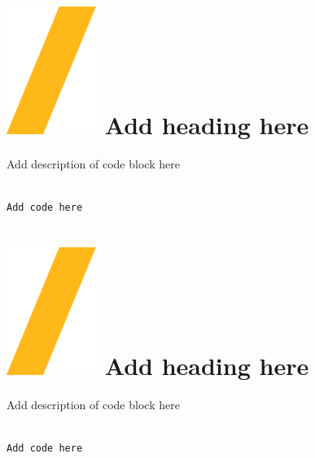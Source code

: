 \documentclass[9pt,landscape]{article}
\begin{document}
\begin{multicols}{3}
\setlength{\premulticols}{1pt}
\setlength{\postmulticols}{1pt}
\setlength{\multicolsep}{1pt}
\setlength{\columnsep}{2pt}


\section{\includegraphics[height=\fontcharht\font`\S]{slash.png} Add heading here}
Add description of code block here
\begin{lstlisting}[language=Python]

Add code here

\end{lstlisting}


\vfill
\section{\includegraphics[height=\fontcharht\font`\S]{slash.png}  Add heading here}
Add description of code block here
\begin{lstlisting}[language=Python]

Add code here

\end{lstlisting} 

\vfill

\end{multicols}
\end{document}
